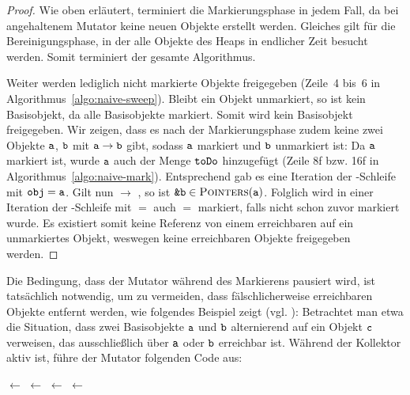 \begin{proof}
	Wie oben erläutert, terminiert die Markierungsphase in jedem Fall, da bei angehaltenem Mutator keine neuen Objekte erstellt werden.
	Gleiches gilt für die Bereinigungsphase, in der alle Objekte des Heaps in endlicher Zeit besucht werden.
	Somit terminiert der gesamte Algorithmus.
	
	Weiter werden lediglich nicht markierte Objekte freigegeben (Zeile~4 bis~6 in Algorithmus~\ref{algo:naive-sweep}).
	Bleibt ein Objekt  unmarkiert, so ist  kein Basisobjekt, da  alle Basisobjekte markiert.
	Somit wird kein Basisobjekt freigegeben.
	Wir zeigen, dass es nach der Markierungsphase zudem keine zwei Objekte $\texttt{a}$, $\texttt{b}$ mit $\texttt{a} \rightarrow \texttt{b}$ gibt, sodass $\texttt{a}$ markiert und $\texttt{b}$ unmarkiert ist:
	Da $\texttt{a}$ markiert ist, wurde $\texttt{a}$ auch der Menge $\texttt{toDo}$ hinzugefügt (Zeile 8f bzw. 16f in Algorithmus~\ref{algo:naive-mark}).
	Entsprechend gab es eine Iteration der \WHILE-Schleife mit $\texttt{obj} = \texttt{a}$.
	Gilt nun  $\rightarrow$ , so ist $\texttt{\&b} \in \textsc{Pointers}(\texttt{a})$.
	Folglich wird in einer Iteration der \FOREACH-Schleife mit  $=$  auch  $=$  markiert, falls  nicht schon zuvor markiert wurde.
	Es existiert somit keine Referenz von einem erreichbaren auf ein unmarkiertes Objekt, weswegen keine erreichbaren Objekte freigegeben werden.
\end{proof}

Die Bedingung, dass der Mutator während des Markierens pausiert wird, ist tatsächlich notwendig, um zu vermeiden, dass fälschlicherweise erreichbaren Objekte entfernt werden, wie folgendes Beispiel zeigt (vgl. \cite[969]{dijkstra1978}):
Betrachtet man etwa die Situation, dass zwei Basisobjekte $\texttt{a}$ und $\texttt{b}$ alternierend auf ein Objekt $\texttt{c}$ verweisen, das ausschließlich über $\texttt{a}$ oder $\texttt{b}$ erreichbar ist.
Während der Kollektor aktiv ist, führe der Mutator folgenden Code aus:

\begin{center}
\begin{minipage}{0.3\textwidth}
	\centering
	\begin{algorithmic}[1]
		\State {} $\gets$ 
		\State {} $\gets$ \Null
		\State {} $\gets$ 
		\State {} $\gets$ \Null
	\end{algorithmic}
\end{minipage}~
\begin{minipage}{0.3\textwidth}
	\centering
	
\end{minipage}~
\begin{minipage}{0.3\textwidth}
	\centering
	
\end{minipage}
\end{center}

